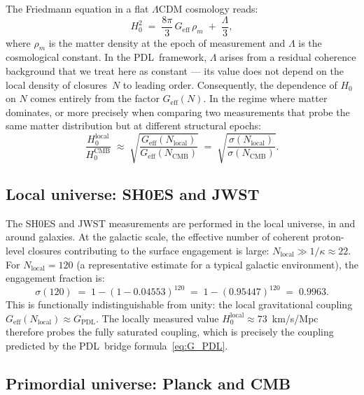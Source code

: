 \documentclass[11pt,a4paper]{article}
\theoremstyle{definition}
\newcommand{\PDL}{\textnormal{PDL}}
\newcommand{\Geff}{G_{\mathrm{eff}}}
\newcommand{\GPDL}{G_{\mathrm{PDL}}}
\newcommand{\Hzero}{H_0}
\newcommand{\kap}{\kappa}
\newcommand{\sig}{\sigma}
\begin{document}
The Friedmann equation in a flat $\Lambda$CDM cosmology reads:
\begin{equation}
  \label{eq:friedmann}
  \Hzero^2 \;=\; \frac{8\pi}{3}\,\Geff\,\rho_m \;+\; \frac{\Lambda}{3},
\end{equation}
where $\rho_m$ is the matter density at the epoch of measurement and $\Lambda$ is the cosmological constant. In the \PDL\ framework, $\Lambda$ arises from a residual coherence background that we treat here as constant --- its value does not depend on the local density of closures~$N$ to leading order.\cite{PDL_Main_2026} Consequently, the dependence of $\Hzero$ on $N$ comes entirely from the factor $\Geff(N)$. In the regime where matter dominates, or more precisely when comparing two measurements that probe the same matter distribution but at different structural epochs:
\begin{equation}
  \label{eq:H0_ratio}
  \frac{\Hzero^{\mathrm{local}}}{\Hzero^{\mathrm{CMB}}} \;\approx\; \sqrt{\frac{\Geff(N_{\mathrm{local}})}{\Geff(N_{\mathrm{CMB}})}} \;=\; \sqrt{\frac{\sig(N_{\mathrm{local}})}{\sig(N_{\mathrm{CMB}})}}.
\end{equation}

\subsection{Local universe: SH0ES and JWST}
\label{subsec:local}

The SH0ES and JWST measurements are performed in the local universe, in and around galaxies. At the galactic scale, the effective number of coherent proton-level closures contributing to the surface engagement is large: $N_{\mathrm{local}} \gg 1/\kap \approx 22$. For $N_{\mathrm{local}} = 120$ (a representative estimate for a typical galactic environment), the engagement fraction is:
\begin{equation}
  \label{eq:sig_local}
  \sig(120) \;=\; 1-(1-0.04553)^{120} \;=\; 1 - (0.95447)^{120} \;=\; 0.9963.
\end{equation}
This is functionally indistinguishable from unity: the local gravitational coupling $\Geff(N_{\mathrm{local}}) \approx \GPDL$. The locally measured value $\Hzero^{\mathrm{local}} \approx 73$~km/s/Mpc therefore probes the fully saturated coupling, which is precisely the coupling predicted by the \PDL\ bridge formula~\eqref{eq:G_PDL}.

\subsection{Primordial universe: Planck and CMB}
\label{subsec:cmb}
\end{document}
